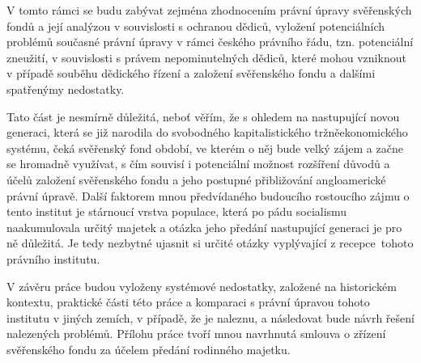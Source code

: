 \documentclass{article}
\begin{document}
\indent V tomto rámci se budu zabývat zejména zhodnocením právní úpravy svěřens\-kých fondů a její analýzou v souvislosti s ochranou dědiců, vyložení potenciálních problémů současné právní úpravy v rámci českého právního řádu, tzn. potenciální zneužití, v souvislosti s právem nepominutelných dědiců, které mohou vzniknout v případě souběhu dědického řízení a založení svěřenského fondu a dalšími spatřenýmy nedostatky.\\
\linebreak

\indent Tato část je nesmírně důležitá, neboť věřím, že s ohledem na nastupující novou generaci, která se již narodila do svobodného kapitalistického tržněeko\-nomického systému, čeká svěřenský fond období, ve kterém o něj bude velký zájem a začne se hromadně využívat, s čím souvisí i potenciální možnost rozšíření důvodů a účelů založení svěřenského fondu a jeho postupné přibližování angloamerické právní úpravě. Další faktorem mnou předvídaného budoucího rostoucího zájmu o tento institut je stárnoucí vrstva populace, která po pádu soci\-alismu naakumulovala určitý majetek a otázka jeho předání nastupující generaci je pro ně důležitá. Je tedy nezbytné ujasnit si určité otázky vyplývající z recepce\ tohoto právního institutu. \\
\linebreak

\indent V závěru práce budou vyloženy systémové nedostatky, založené na historickém kontextu, praktické části této práce a komparaci s právní úpravou tohoto institutu v jiných zemích, v případě, že je naleznu, a následovat bude návrh řešení nalezených problémů. Přílohu práce tvoří mnou navrhnutá smlouva o zřízení svěřenského fondu za účelem předání rodinného majetku.

\end{document}
